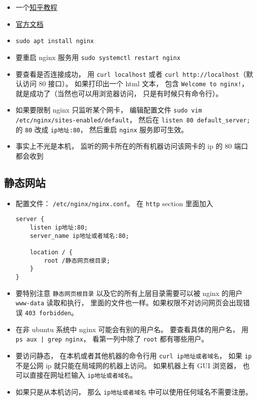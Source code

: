 
\begin{issues}
\issueDraft
\end{issues}

\begin{itemize}
\item 一个\href{https://zhuanlan.zhihu.com/p/80600540}{知乎教程}
\item \href{https://nginx.org/en/docs/}{官方文档}
\item \verb|sudo apt install nginx|
\item 要重启 nginx 服务用 \verb|sudo systemctl restart nginx|
\item 要查看是否连接成功， 用 \verb|curl localhost| 或者 \verb|curl http://localhost|（默认访问 80 接口）。 如果打印出一个 html 文本， 包含 \verb|Welcome to nginx!|， 就是成功了（当然也可以用浏览器访问， 只是有时候只有命令行）。
\item 如果要限制 nginx 只监听某个网卡， 编辑配置文件 \verb|sudo vim /etc/nginx/sites-enabled/default|， 然后在 \verb|listen 80 default_server;| 的 \verb|80| 改成 \verb|ip地址:80|， 然后重启 \verb|nginx| 服务即可生效。
\item 事实上不光是本机， 监听的网卡所在的所有机器访问该网卡的 ip 的 80 端口都会收到
\end{itemize}

\subsection{静态网站}
\begin{itemize}
\item 配置文件： \verb|/etc/nginx/nginx.conf|。 在 \verb|http| section 里面加入
\begin{lstlisting}[language=none]
server {
    listen ip地址:80;
    server_name ip地址或者域名:80;
    
    location / {
        root /静态网页根目录;
    }
}
\end{lstlisting}
\item 要特别注意 \verb|静态网页根目录| 以及它的所有上层目录需要可以被 nginx 的用户 \verb|www-data| 读取和执行， 里面的文件也一样。如果权限不对访问网页会出现错误 \verb|403 forbidden|。
\item 在非 ubuntu 系统中 nginx 可能会有别的用户名。  要查看具体的用户名， 用 \verb`ps aux | grep nginx`， 看第一列中除了 \verb|root| 都有哪些用户。
\item 要访问静态， 在本机或者其他机器的命令行用 \verb|curl ip地址或者域名|， 如果 \verb|ip| 不是公网 ip 就只能在局域网的机器上访问。 如果机器上有 GUI 浏览器， 也可以直接在网址栏输入 \verb|ip地址或者域名|。
\item 如果只是从本机访问， 那么 \verb|ip地址或者域名| 中可以使用任何域名不需要注册。
\end{itemize}

